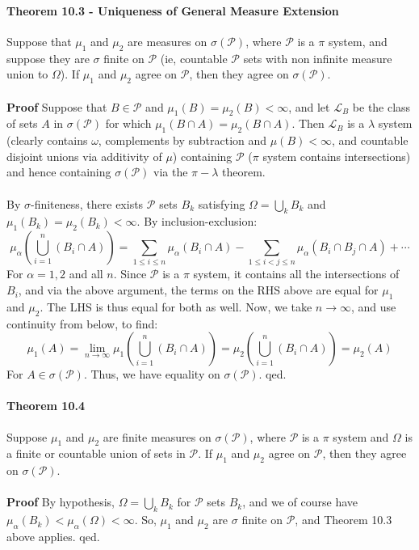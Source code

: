 \documentclass[12pt,a4paper]{article}
\newcommand{\1}[1]{\mathbbm{1}\left\{ #1 \right\}}
\newcommand{\lcal}{\mathcal{L}}
\newcommand{\pcal}{\mathcal{P}}
\begin{document}
\paragraph{Theorem 10.3 - Uniqueness of General Measure Extension} Suppose that $\mu_1$ and $\mu_2$ are measures on $\sigma(\pcal)$, where $\pcal$ is a $\pi$ system, and suppose they are $\sigma$ finite on $\pcal$ (ie, countable $\pcal$ sets with non infinite measure union to $\Omega$). If $\mu_1$ and $\mu_2$ agree on $\pcal$, then they agree on $\sigma(\pcal)$.
\\\\
\textbf{Proof} Suppose that $B \in \pcal$ and $\mu_1(B) = \mu_2(B) < \infty$, and let $\lcal_B$ be the class of sets $A$ in $\sigma(\pcal)$ for which $\mu_1(B \cap A) = \mu_2(B \cap A)$. Then $\lcal_B$ is a $\lambda$ system (clearly contains $\omega$, complements by subtraction and $\mu(B) < \infty$, and countable disjoint unions via additivity of $\mu$) containing $\pcal$ ($\pi$ system contains intersections) and hence containing $\sigma(\pcal)$ via the $\pi-\lambda$ theorem.
\\\\
By $\sigma$-finiteness, there exists $\pcal$ sets $B_k$ satisfying $\Omega = \bigcup_k B_k$ and $\mu_1(B_k) = \mu_2(B_k) < \infty$. By inclusion-exclusion:
$$
	\mu_\alpha\left(\bigcup_{i=1}^n (B_i \cap A)\right) = \sum_{1 \leq i \leq n} \mu_\alpha(B_i \cap A) -
	\sum_{1 \leq i < j \leq n} \mu_\alpha(B_i \cap B_j \cap A) + \cdots
$$
For $\alpha = 1, 2$ and all $n$. Since $\pcal$ is a $\pi$ system, it contains all the intersections of $B_i$, and via the above argument, the terms on the RHS above are equal for $\mu_1$ and $\mu_2$. The LHS is thus equal for both as well. Now, we take $n \to \infty$, and use continuity from below, to find:
$$
	\mu_1(A) = \lim_{n \to \infty} \mu_1\left(\bigcup_{i=1}^n (B_i \cap A)\right) =
	\mu_2\left(\bigcup_{i=1}^n (B_i \cap A)\right) = \mu_2(A)
$$
For $A \in \sigma(\pcal)$. Thus, we have equality on $\sigma(\pcal)$. qed.

\paragraph{Theorem 10.4} Suppose $\mu_1$ and $\mu_2$ are finite measures on $\sigma(\pcal)$, where $\pcal$ is a $\pi$ system and $\Omega$ is a finite or countable union of sets in $\pcal$. If $\mu_1$ and $\mu_2$ agree on $\pcal$, then they agree on $\sigma(\pcal)$.
\\\\
\textbf{Proof} By hypothesis, $\Omega = \bigcup_k B_k$ for $\pcal$ sets $B_k$, and we of course have $\mu_\alpha(B_k) < \mu_\alpha(\Omega) < \infty$. So, $\mu_1$ and $\mu_2$ are $\sigma$ finite on $\pcal$, and Theorem 10.3 above applies. qed.
\end{document}
